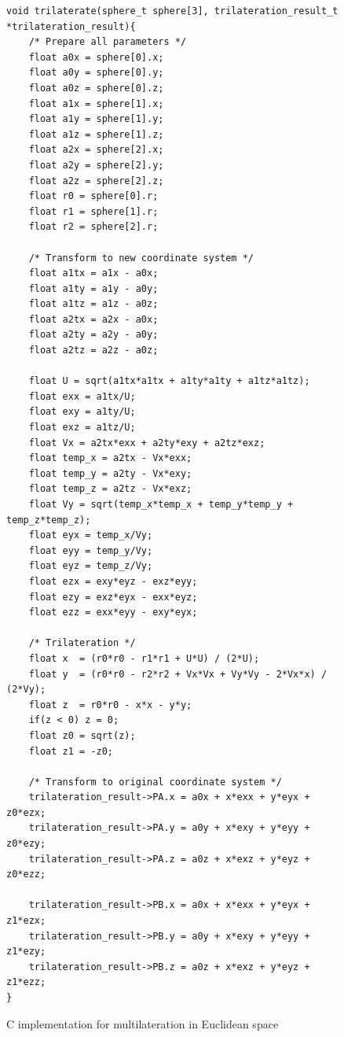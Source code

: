 \documentclass[\main/main.tex]{subfiles}
\begin{document}
\begin{figure}[H]
    \begin{lstlisting}[style=CStyle]
void trilaterate(sphere_t sphere[3], trilateration_result_t *trilateration_result){
    /* Prepare all parameters */
    float a0x = sphere[0].x;
    float a0y = sphere[0].y;
    float a0z = sphere[0].z;
    float a1x = sphere[1].x;
    float a1y = sphere[1].y;
    float a1z = sphere[1].z;
    float a2x = sphere[2].x;
    float a2y = sphere[2].y;
    float a2z = sphere[2].z;
    float r0 = sphere[0].r;
    float r1 = sphere[1].r;
    float r2 = sphere[2].r;

    /* Transform to new coordinate system */
    float a1tx = a1x - a0x;
    float a1ty = a1y - a0y;
    float a1tz = a1z - a0z;
    float a2tx = a2x - a0x;
    float a2ty = a2y - a0y;
    float a2tz = a2z - a0z;
    
    float U = sqrt(a1tx*a1tx + a1ty*a1ty + a1tz*a1tz);
    float exx = a1tx/U;
    float exy = a1ty/U;
    float exz = a1tz/U;
    float Vx = a2tx*exx + a2ty*exy + a2tz*exz;
    float temp_x = a2tx - Vx*exx;
    float temp_y = a2ty - Vx*exy;
    float temp_z = a2tz - Vx*exz;
    float Vy = sqrt(temp_x*temp_x + temp_y*temp_y + temp_z*temp_z);
    float eyx = temp_x/Vy;
    float eyy = temp_y/Vy;
    float eyz = temp_z/Vy;
    float ezx = exy*eyz - exz*eyy;
    float ezy = exz*eyx - exx*eyz;
    float ezz = exx*eyy - exy*eyx;

    /* Trilateration */
    float x  = (r0*r0 - r1*r1 + U*U) / (2*U);
    float y  = (r0*r0 - r2*r2 + Vx*Vx + Vy*Vy - 2*Vx*x) / (2*Vy);
    float z  = r0*r0 - x*x - y*y;
    if(z < 0) z = 0;
    float z0 = sqrt(z);
    float z1 = -z0;

    /* Transform to original coordinate system */
    trilateration_result->PA.x = a0x + x*exx + y*eyx + z0*ezx;
    trilateration_result->PA.y = a0y + x*exy + y*eyy + z0*ezy;
    trilateration_result->PA.z = a0z + x*exz + y*eyz + z0*ezz;

    trilateration_result->PB.x = a0x + x*exx + y*eyx + z1*ezx;
    trilateration_result->PB.y = a0y + x*exy + y*eyy + z1*ezy;
    trilateration_result->PB.z = a0z + x*exz + y*eyz + z1*ezz;
}
    \end{lstlisting}
    \caption{C implementation for multilateration in Euclidean space}
    \label{fig:multilateration_c_implementation}
\end{figure}
\end{document}
